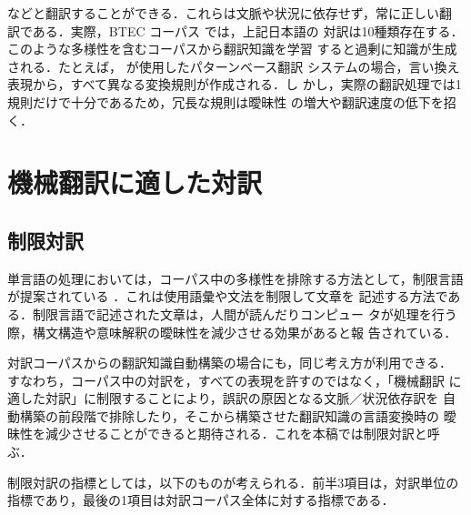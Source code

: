 \noindent
などと翻訳することができる．これらは文脈や状況に依存せず，常に正しい翻
訳である．実際，BTEC コーパス
\cite{Takezawa:PBCorpus2002,Kikui:BTECandMADCorpus}では，上記日本語の
対訳は10種類存在する．このような多様性を含むコーパスから翻訳知識を学習
すると過剰に知識が生成される．たとえば，
が使用したパターンベース翻訳
システムの場合，言い換え表現から，すべて異なる変換規則が作成される．し
かし，実際の翻訳処理では1規則だけで十分であるため，冗長な規則は曖昧性
の増大や翻訳速度の低下を招く\cite{Meyers:PAandTranslation2000}．


\section{機械翻訳に適した対訳}
\label{sec-controlled-translation}

\subsection{制限対訳}

単言語の処理においては，コーパス中の多様性を排除する方法として，制限言語
が提案されている
\cite{Mitamura:ControlledLanguage1991,Mitamura:ControlledLanguage1995,
Huijsen:ControlledLanguage1998}．これは使用語彙や文法を制限して文章を
記述する方法である．制限言語で記述された文章は，人間が読んだりコンピュー
タが処理を行う際，構文構造や意味解釈の曖昧性を減少させる効果があると報
告されている．

対訳コーパスからの翻訳知識自動構築の場合にも，同じ考え方が利用できる．
すなわち，コーパス中の対訳を，すべての表現を許すのではなく，「機械翻訳
に適した対訳」に制限することにより，誤訳の原因となる文脈／状況依存訳を
自動構築の前段階で排除したり，そこから構築させた翻訳知識の言語変換時の
曖昧性を減少させることができると期待される．これを本稿では制限対訳と呼
ぶ．

制限対訳の指標としては，以下のものが考えられる．前半3項目は，対訳単位の
指標であり，最後の1項目は対訳コーパス全体に対する指標である．

